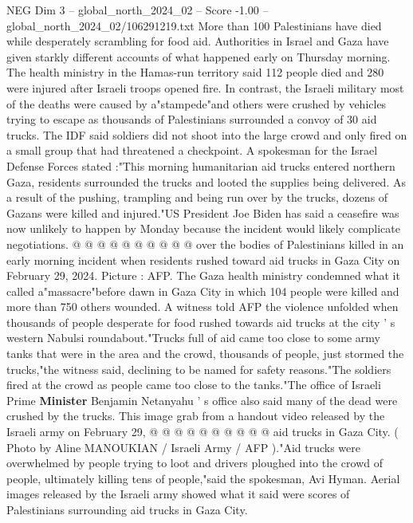 \begin{textsample}{NEG Dim 3 – global\_north\_2024\_02 – Score -1.00 – global\_north\_2024\_02/106291219.txt}  \label{ex:f3_neg_203}
More than 100 Palestinians have died while desperately scrambling for food aid.
Authorities in Israel and Gaza have given starkly different accounts of what happened early on Thursday morning.
The health ministry in the Hamas-run territory said 112 people died and 280 were injured after Israeli troops opened fire.
In contrast, the Israeli military most of the deaths were caused by a"stampede"and others were crushed by vehicles trying to escape as thousands of Palestinians surrounded a convoy of 30 aid trucks.
The IDF said soldiers did not shoot into the large crowd and only fired on a small group that had threatened a checkpoint.
A spokesman for the Israel Defense Forces stated :"This morning humanitarian aid trucks entered northern Gaza, residents surrounded the trucks and looted the supplies being delivered.
As a result of the pushing, trampling and being run over by the trucks, dozens of Gazans were killed and injured."US President Joe Biden has said a ceasefire was now unlikely to happen by Monday because the incident would likely complicate negotiations. @ @ @ @ @ @ @ @ @ @ over the bodies of Palestinians killed in an early morning incident when residents rushed toward aid trucks in Gaza City on February 29, 2024.
Picture : AFP.
The Gaza health ministry condemned what it called a"massacre"before dawn in Gaza City in which 104 people were killed and more than 750 others wounded.
A witness told AFP the violence unfolded when thousands of people desperate for food rushed towards aid trucks at the city ' s western Nabulsi roundabout."Trucks full of aid came too close to some army tanks that were in the area and the crowd, thousands of people, just stormed the trucks,"the witness said, declining to be named for safety reasons."The soldiers fired at the crowd as people came too close to the tanks."The office of Israeli Prime \textbf{Minister} Benjamin Netanyahu ' s office also said many of the dead were crushed by the trucks.
This image grab from a handout video released by the Israeli army on February 29, @ @ @ @ @ @ @ @ @ @ aid trucks in Gaza City. ( Photo by Aline MANOUKIAN / Israeli Army / AFP )."Aid trucks were overwhelmed by people trying to loot and drivers ploughed into the crowd of people, ultimately killing tens of people,"said the spokesman, Avi Hyman.
Aerial images released by the Israeli army showed what it said were scores of Palestinians surrounding aid trucks in Gaza City.

\end{textsample}

